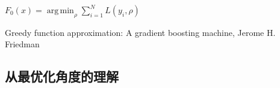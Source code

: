 \begin{frame}
    \begin{algorithm}[H]
        $F_0(x) = \operatorname{arg \, min}_\rho \sum_{i=1}^N L(y_i, \rho)$ \;
        \caption{Gradient\_Boost}
    \end{algorithm}
    {\tiny Greedy function approximation: A gradient boosting machine, Jerome H. Friedman}
\end{frame}


\subsection{从最优化角度的理解}
\begin{frame}
    \begin{figure}
        \centering
        \subfigure[][]{
            \resizebox{0.53\linewidth}{!}{}
        }
        \hfil
        \subfigure[][]{
            \resizebox{0.40\linewidth}{!}{}
        }
    \end{figure}
\end{frame}

\begin{frame}
    \begin{figure}
        \centering
        \resizebox{1.1\onepicwidth}{!}{}
    \end{figure}
\end{frame}

\begin{frame}
    \begin{figure}
        \centering
        \resizebox{\textwidth}{!}{}
    \end{figure}
\end{frame}

\begin{frame}
    \begin{figure}
        \centering
        \resizebox{1.1\onepicwidth}{!}{}
    \end{figure}
\end{frame}


